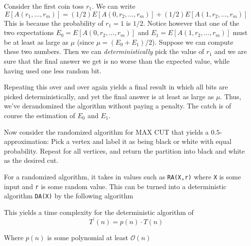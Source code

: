 \documentclass[addpoints]{exam}
\newcommand{\BigO}[1]{\mathcal{O}\left( #1\right)}
\begin{document}
\begin{questions}
\begin{parts}
  Consider the first coin toss $r_1$. We can write 
\[ E[A(r_1, \ldots, r_m)] = (1/2)E[A(0, r_2, \ldots, r_m)] + (1/2)E[A(1, r_2,
\ldots, r_m)] \]
This is because the probability of $r_1 = 1$ is $1/2$. Notice however that one
of the two expectations $E_0 = E[A(0, r_2, \ldots, r_m)]$ and $E_1 = E[A(1, r_2,
\ldots, r_m)]$ must be at least as large as $\mu$ (since $\mu = (E_0 +
E_1)/2$). Suppose we can compute these two numbers. Then we can
\emph{deterministically} pick the value of $r_1$ and we are sure that the final
answer we get is no worse than the expected value, while having used one less
random bit. 

Repeating this over and over again yields a final result in which all bits are
picked deterministically, and yet the final answer is at least as large as
$\mu$. Thus, we've derandomized the algorithm without paying a penalty. The catch is of course the estimation of $E_0$ and $E_1$. 

Now consider the randomized algorithm for MAX CUT that yields a
$0.5$-approximation: Pick a vertex and label it as being black or white with
equal probability. Repeat for all vertices, and return the partition into black
and white as the desired cut. 

  \begin{solution}
    For a randomized algorithm, it takes in values such as \verb~RA(X,r)~ where \verb~X~ is some input and \verb~r~ is some random value. This can be turned into a deterministic algorithm \verb~DA(X)~ by the following algorithm
    \begin{algorithmic}
      \ENDFOR
    \end{algorithmic}
  This yields a time complexity for the deterministic algorithm of 
\[
T^{\prime}(n) = p(n)\cdot T(n)
\]

Where $p(n)$ is some polynomial at least $\BigO{n}$
  \end{solution}


\end{parts}
\end{questions}
\end{document}
